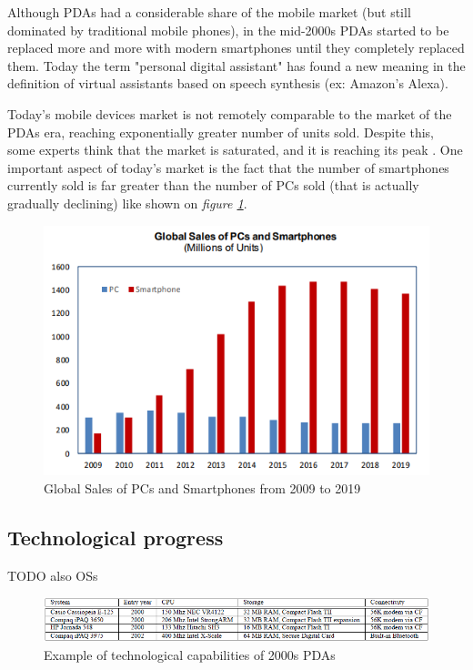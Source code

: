 Although PDAs had a considerable share of the mobile market (but still dominated by traditional mobile phones), in the mid-2000s PDAs started to be replaced more and more with modern smartphones until they completely replaced them.
Today the term "personal digital assistant" has found a new meaning in the definition of virtual assistants based on speech synthesis (ex: Amazon's Alexa).

Today's mobile devices market is not remotely comparable to the market of the PDAs era, reaching exponentially greater number of units sold. Despite this, some experts think that the market is saturated, and it is reaching its peak \cite{smartphones_sales}. One important aspect of today's market is the fact that the number of smartphones currently sold is far greater than the number of PCs sold (that is actually gradually declining) like shown on \textit{figure \ref{fig:global_sales_of_pcs_and_smartphones}}.

\begin{figure}[!ht]
    \centering
    \includegraphics[scale=0.9]{document/chapters/chapter_1/images/global_sales_of_pcs_and_smartphones.png}
    \caption{Global Sales of PCs and Smartphones from 2009 to 2019 \cite{smartphones_sales}}
    \label{fig:global_sales_of_pcs_and_smartphones}
\end{figure}

\subsection{Technological progress}
TODO also OSs

\begin{figure}[!ht]
    \centering
    \includegraphics[scale=0.75]{document/chapters/chapter_1/images/pda_capabilities.png}
    \caption{Example of technological capabilities of 2000s PDAs \cite{integrating_mobile_devices_into_grid}}
    \label{fig:pda_capabilities}
\end{figure}

